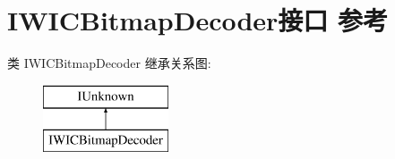 \hypertarget{interface_i_w_i_c_bitmap_decoder}{}\section{I\+W\+I\+C\+Bitmap\+Decoder接口 参考}
\label{interface_i_w_i_c_bitmap_decoder}
类 I\+W\+I\+C\+Bitmap\+Decoder 继承关系图\+:\begin{figure}[H]
\begin{center}
\leavevmode
\includegraphics[height=2.000000cm]{interface_i_w_i_c_bitmap_decoder}
\end{center}
\end{figure}
